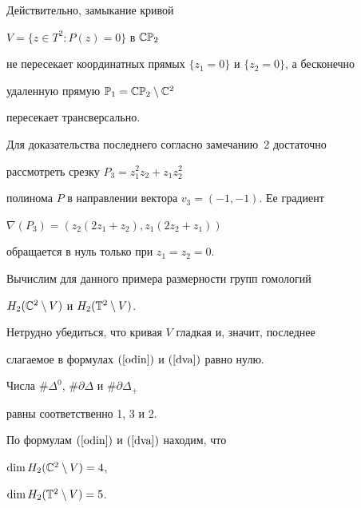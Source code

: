 \begin{exam}
Действительно, замыкание кривой


$V=\{z\in T^2 : P(z)=0\}$ в $\Bbb{CP}_2$


не пересекает координатных прямых $\{z_1=0\}$ и $\{z_2=0\}$, а бесконечно


удаленную прямую $\Bbb P_1=\Bbb{CP}_2\setminus \Bbb C^2$


пересекает трансверсально.


Для доказательства последнего согласно замечанию~2 достаточно


рассмотреть срезку $P_3=z_1^2 z_2+z_1 z_2^2$


полинома $P$ в направлении вектора $v_3=(-1,-1)$. Ее градиент


$\nabla(P_3)=(z_2(2z_1+z_2),z_1(2z_2+z_1))$


обращается в нуль только при $z_1=z_2=0$.





Вычислим для данного примера размерности групп гомологий


$H_2(\Bbb C^2\setminus V)$ и $H_2(\Bbb T^2\setminus V)$.


Нетрудно убедиться, что кривая $V$ гладкая и, значит, последнее


слагаемое в формулах $(\ref{odin})$ и $(\ref{dva})$ равно нулю.


Числа $\#\Delta^0$, $\#\partial\Delta$ и $\#\partial\Delta_+$


равны соответственно 1, 3 и 2.


По формулам $(\ref{odin})$ и $(\ref{dva})$ находим, что


$\dim H_2(\Bbb C^2\setminus V)=4$,


$\dim H_2(\Bbb T^2\setminus V)=5$.


\end{exam}





